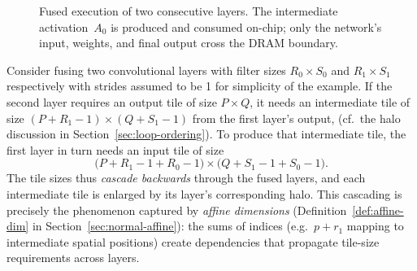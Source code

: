 \begin{figure}[t]
\centering
{}
\caption{Fused execution of two consecutive layers.  The intermediate
  activation~$A_0$ is produced and consumed on-chip; only the network's
  input, weights, and final output cross the DRAM boundary.}
\label{fig:fused-two-layers}
\end{figure}

Consider fusing two convolutional layers with filter sizes
$R_0\!\times\!S_0$ and $R_1\!\times\!S_1$ respectively with strides assumed to be 1 for simplicity of the example.
If the second layer requires an output tile of size $P\!\times\!Q$, it
needs an intermediate tile of size
$(P+R_1-1)\times(Q+S_1-1)$ from the first layer's output,
(cf.\ the halo discussion in Section~\ref{sec:loop-ordering}).
To produce that intermediate tile, the first layer in turn needs an input
tile of size
\begin{equation}
\label{eq:fused-input-tile}
\bigl(P + R_1 - 1 + R_0 - 1\bigr) \times
\bigl(Q + S_1 - 1 + S_0 - 1\bigr).
\end{equation}
The tile sizes thus \emph{cascade backwards} through the fused layers,
and each intermediate tile is enlarged by its layer's corresponding
halo.  This cascading is precisely the phenomenon captured by
\emph{affine dimensions} (Definition~\ref{def:affine-dim} in
Section~\ref{sec:normal-affine}): the sums of indices (e.g.\ $p + r_1$
mapping to intermediate spatial positions) create dependencies that
propagate tile-size requirements across layers.

